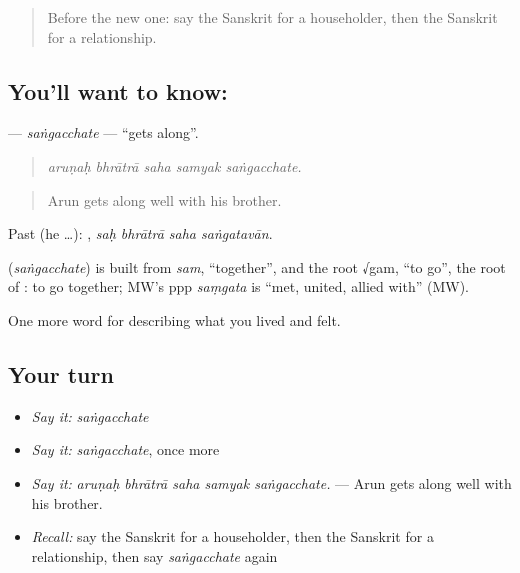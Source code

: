 \label{lesson:SA-C501-sangacchate}



\begin{quote}
Before the new one: say the Sanskrit for a householder, then the Sanskrit for a relationship.
\end{quote}

\subsection*{You'll want to know: }
\textbf{} — \emph{saṅgacchate} — \textquotedblleft{}gets along\textquotedblright{}.

\begin{quote}
    
\end{quote}

\begin{quote}
\emph{aruṇaḥ bhrātrā saha samyak saṅgacchate.}
\end{quote}

\begin{quote}
Arun gets along well with his brother.
\end{quote}

Past (he …):    , \emph{saḥ bhrātrā saha saṅgatavān}.

\begin{cousinweb}
\textbf{} (\emph{saṅgacchate}) is built from \emph{sam}, \textquotedblleft{}together\textquotedblright{}, and the root √gam, \textquotedblleft{}to go\textquotedblright{}, the root of \textbf{}: to go together; MW's ppp \emph{saṃgata} is \textquotedblleft{}met, united, allied with\textquotedblright{} (MW).
\end{cousinweb}

\begin{grammarlens}[title={What you've built}]
One more word for describing what you lived and felt.
\end{grammarlens}

\subsection*{Your turn}
\begin{itemize}
\raggedright
  \item \emph{Say it:} \emph{saṅgacchate}
  \item \emph{Say it:} \emph{saṅgacchate}, once more
  \item \emph{Say it:} \emph{aruṇaḥ bhrātrā saha samyak saṅgacchate.} — Arun gets along well with his brother.
  \item \emph{Recall:} say the Sanskrit for a householder, then the Sanskrit for a relationship, then say \emph{saṅgacchate} again
\end{itemize}

